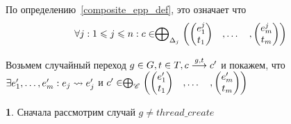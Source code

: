 По определению~\ref{composite_epp_def}, это означает что
$$\forall j: 1\leqslant j \leqslant n: c \in  \mathrel{\bigoplus}_{\Delta_j}
\begin{pmatrix}
\begin{pmatrix}
e^j_1 \\
t_1 
\end{pmatrix}& ,
\dots& ,
\begin{pmatrix}
e^j_m \\
t_m 
\end{pmatrix}
\end{pmatrix}$$

Возьмем случайный переход
$ g \in G, t \in T, c \stackrel{g,t}{\longrightarrow} c'$ и покажем, что 
$\exists e_1', \dots, e_m': e_j \leadsto e_j'$ и
$c' \in  \mathrel{\bigoplus}_{\mathscr{C}}
\begin{pmatrix}
\begin{pmatrix}
e_1' \\
t_1 
\end{pmatrix}& ,
\dots& ,
\begin{pmatrix}
e_m' \\
t_m 
\end{pmatrix}
\end{pmatrix}$

{\textbf 1.} Сначала рассмотрим случай $g \neq thread\_create$

